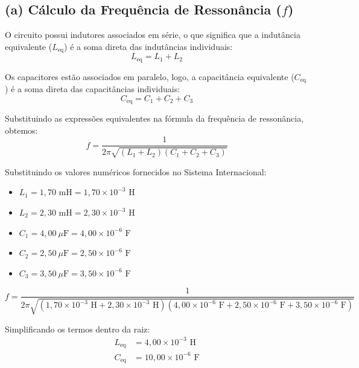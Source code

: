 \documentclass[12pt,a4paper]{article}
\begin{document}
\subsection*{(a) Cálculo da Frequência de Ressonância ($f$)}

O circuito possui indutores associados em série, o que significa que a indutância equivalente ($L_{\text{eq}}$) é a soma direta das indutâncias individuais:
\begin{equation*}
L_{\text{eq}} = L_1 + L_2
\end{equation*}

Os capacitores estão associados em paralelo, logo, a capacitância equivalente ($C_{\text{eq}}$) é a soma direta das capacitâncias individuais:
\begin{equation*}
C_{\text{eq}} = C_1 + C_2 + C_3
\end{equation*}

Substituindo as expressões equivalentes na fórmula da frequência de ressonância, obtemos:
\begin{equation*}
f = \frac{1}{2\pi\sqrt{(L_1 + L_2)(C_1 + C_2 + C_3)}}
\end{equation*}

Substituindo os valores numéricos fornecidos no Sistema Internacional:
\begin{itemize}
    \item $L_1 = 1,70\text{ mH} = 1,70 \times 10^{-3}\text{ H}$
    \item $L_2 = 2,30\text{ mH} = 2,30 \times 10^{-3}\text{ H}$
    \item $C_1 = 4,00\ \mu\text{F} = 4,00 \times 10^{-6}\text{ F}$
    \item $C_2 = 2,50\ \mu\text{F} = 2,50 \times 10^{-6}\text{ F}$
    \item $C_3 = 3,50\ \mu\text{F} = 3,50 \times 10^{-6}\text{ F}$
\end{itemize}

\begin{equation*}
f = \frac{1}{2\pi\sqrt{(1,70 \times 10^{-3}\text{ H} + 2,30 \times 10^{-3}\text{ H})(4,00 \times 10^{-6}\text{ F} + 2,50 \times 10^{-6}\text{ F} + 3,50 \times 10^{-6}\text{ F})}}
\end{equation*}

Simplificando os termos dentro da raiz:
\begin{align*}
L_{\text{eq}} &= 4,00 \times 10^{-3}\text{ H} \\
C_{\text{eq}} &= 10,00 \times 10^{-6}\text{ F}
\end{align*}
\end{document}
